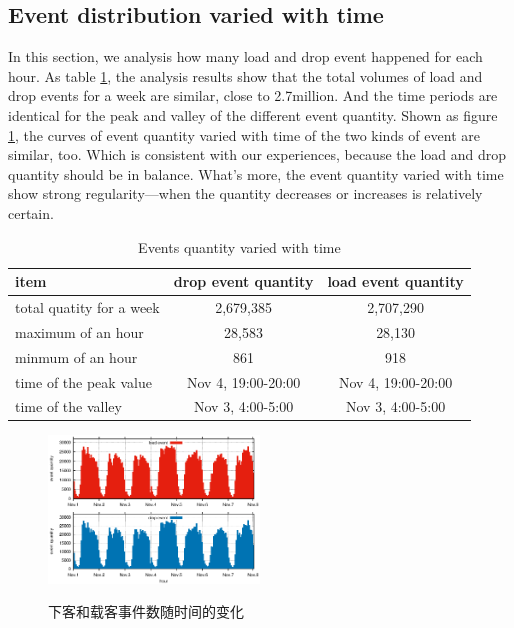 \subsection{Event distribution varied with time}

In this section, we analysis how many load and drop event happened for each hour. As table \ref{table_event_distribution_with_time}, the analysis results show that the total volumes of load and drop events for a week are similar, close to 2.7million. And the time periods are identical for the peak and valley of the different event quantity. 
Shown as figure \ref{figure_event_varied_w_t}, the curves of event quantity varied with time of the two kinds of event are similar, too. Which is consistent  with our experiences, because the load and drop quantity should be in balance.  What’s more, the event quantity varied with time show strong regularity—when the quantity decreases or increases is relatively certain.

\begin{table}[!h]
\caption{Events quantity varied with time}\label{table_event_distribution_with_time}
\centering
\begin{tabular}{l|c|c}
 \hline
 item &drop event quantity &load event quantity \\
  \hline
  total quatity for a week& 2,679,385&2,707,290\\
  maximum of an hour&28,583 &28,130\\
  minmum of an hour&861&918\\
  time of the peak value&Nov 4, 19:00-20:00&Nov 4, 19:00-20:00\\
  time of the valley&Nov 3, 4:00-5:00&Nov 3, 4:00-5:00\\
  \hline
  \end{tabular}
\end{table}

\begin{figure}[!t]
\centering
\includegraphics[width=0.5\textwidth]{figures/analysis/event_w_time.eps}\\
\caption{下客和载客事件数随时间的变化}\label{figure_event_varied_w_t}
\end{figure}


